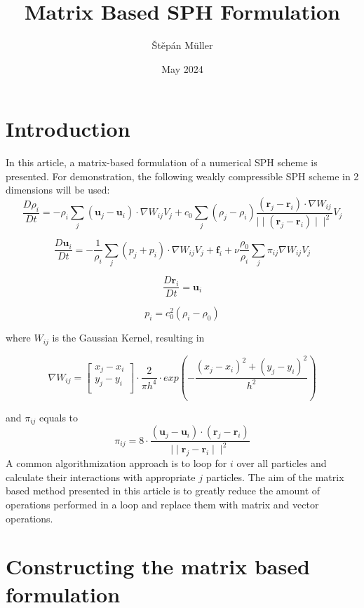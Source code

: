 \documentclass{article}
\title{Matrix Based SPH Formulation}
\author{Štěpán Müller}
\affil{Czech Technical University in Prague, Faculty of Mechanical Engineering}
\date{May 2024}
\begin{document}
\maketitle

\section{Introduction}
In this article, a matrix-based formulation of a numerical SPH scheme is presented. 
For demonstration, the following weakly compressible SPH scheme in 2 dimensions will be used:
$$\frac{D\rho_i}{Dt}=-\rho_i\sum_j\left(\textbf{u}_j-\textbf{u}_i\right)\cdot\nabla W_{ij}V_j+c_0\sum_j\left(\rho_j-\rho_i\right)\frac{\left(\textbf{r}_j-\textbf{r}_i\right)\cdot \nabla W_{ij}}{\mid\mid\left(\textbf{r}_j-\textbf{r}_i\right)\mid\mid^2}V_j$$

$$\frac{D\textbf{u}_i}{Dt}=-\frac{1}{\rho_i}\sum_j\left(p_j+p_i\right)\cdot\nabla W_{ij}V_j+\textbf{f}_i+\nu\frac{\rho_0}{\rho_i}\sum_j\pi_{ij}\nabla W_{ij}V_j$$

$$\frac{D\textbf{r}_i}{Dt}=\textbf{u}_i$$

$$p_i=c_0^2\left(\rho_i-\rho_0\right)$$

where $W_{ij}$ is the Gaussian Kernel, resulting in

$$\nabla W_{ij}= 
\begin{bmatrix}
x_j - x_i \\
y_j - y_i \\
\end{bmatrix}
\cdot\frac{2}{\pi h^4}\cdot exp\left(-\frac{\left(x_j-x_i\right)^2+\left(y_j-y_i\right)^2}{h^2}\right)$$

and $\pi_{ij}$ equals to
$$\pi_{ij}=8\cdot\frac{\left(\textbf{u}_j-\textbf{u}_i\right)\cdot\left(\textbf{r}_j-\textbf{r}_i\right)}{\mid\mid\textbf{r}_j-\textbf{r}_i\mid\mid^2}$$
A common algorithmization approach is to loop for $i$ over all particles and calculate their interactions with appropriate $j$ particles. The aim of the matrix based method presented in this article is to greatly reduce the amount of operations performed in a loop and replace them with matrix and vector operations.

\section{Constructing the matrix based formulation}
\end{document}

